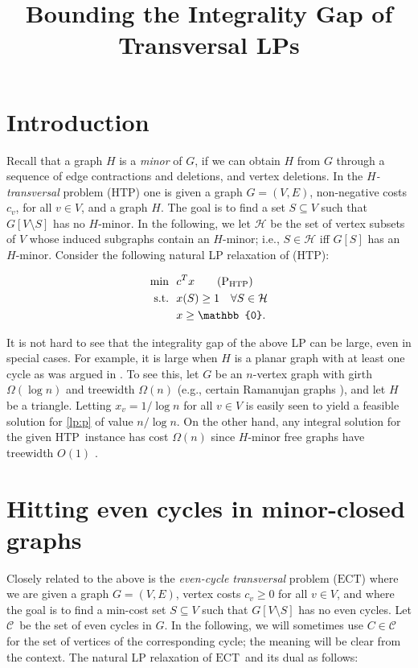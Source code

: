 \documentclass{article}
\title{Bounding the Integrality Gap of Transversal LPs}
\newcommand{\st}{\ensuremath{\mbox{s.t.}}}
\newcommand{\htp}{\ensuremath{\mbox{HTP}}}
\newcommand{\ect}{\ensuremath{\mbox{ECT}}}
\renewcommand{\H}{\ensuremath{\mathcal{H}}}
\newcommand{\C}{\ensuremath{\mathcal{C}}}
\newcommand{\0}{\mathbb{0}}
\newcommand{\1}{\mathbb{1}}
\begin{document}
\maketitle

\section{Introduction}

Recall that a graph $H$ is a {\em minor} of $G$, if we can obtain $H$
from $G$ through a sequence of edge contractions and deletions, and
vertex deletions. In the {\em $H$-transversal} problem (\htp) one is
given a graph $G=(V,E)$, non-negative costs $c_v$, for all $v \in V$,
and a graph $H$. The goal is to find a set $S \subseteq V$ such that
$G[V\setminus S]$ has no $H$-minor.
In the following, we let $\H$
be the set of vertex subsets of $V$ whose induced subgraphs contain an
$H$-minor; i.e., $S \in \H$ iff $G[S]$ has an $H$-minor. Consider the
following natural LP relaxation of (\htp):

\begin{align}
  \min ~~ & c^Tx \tag{$\mbox{P}_{\scriptsize \htp}$}\label{lp:p} \\
  \st ~~ & x(S) \geq 1 \quad \forall S \in \H \notag \\
          & x \geq \0. \notag
\end{align}

It is not hard to see that the integrality gap of the above LP can be
large, even in special cases. For example, it is large when $H$ is a
planar graph with at least one cycle as was argued in \cite{BH+19}.
To see this, let $G$ be an $n$-vertex graph with girth $\Omega(\log n)$
and treewidth $\Omega(n)$ (e.g., certain Ramanujan graphs
\cite{Mo94}), and let $H$ be a triangle. Letting $x_v = 1/\log n$ for
all $v \in V$ is easily seen to yield a feasible solution for
\eqref{lp:p} of value $n/\log n$. On the other hand, any integral
solution for the given \htp\ instance has cost $\Omega(n)$ since
$H$-minor free graphs have treewidth $O(1)$ \cite{BH+19}. 

\section{Hitting even cycles in minor-closed graphs}

Closely related to the above is the 
{\em even-cycle transversal} problem (\ect) where
we are given a graph $G=(V,E)$, vertex costs $c_v \geq 0$ for all
$v \in V$, and where the goal is to find a min-cost set
$S \subseteq V$ such that $G[V\setminus S]$ has no even cycles. Let
\C\ be the set of even cycles in $G$. In the following, we will sometimes 
use $C \in \C$ for the set of vertices of the corresponding cycle; the meaning will be
clear from the context. 
The natural LP relaxation of \ect\ and its dual as follows:
\end{document}
